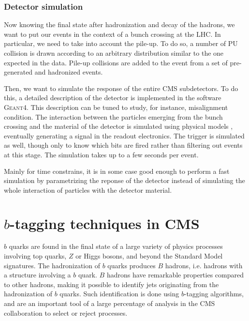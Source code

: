             \subsection{Detector simulation}

            Now knowing the final state after hadronization and decay of the hadrons, we
            want to put our events in the context of a bunch crossing at the LHC. In
            particular, we need to take into account the pile-up. To do so, a number of
            PU collision is drawn according to an arbitrary distribution similar to the
            one expected in the data. Pile-up collisions are added to the event from a
            set of pre-generated and hadronized events.

            Then, we want to simulate the response of the entire CMS subdetectors. To do
            this, a detailed description of the detector is implemented in the software
            \textsc{Geant4}. This description can be tuned to study, for instance,
            misalignment condition. The interaction between the particles emerging from
            the bunch crossing and the material of the detector is simulated using physical
            models , eventually generating a signal in
            the readout electronics. The trigger is simulated as well, though only to know
            which bits are fired rather than filtering out events at this stage. The
            simulation takes up to a few seconds per event.

            Mainly for time constrains, it is in some case good enough to perform a
            fast simulation by parametrizing the reponse of the detector instead of
            simulating the whole interaction of particles with the detector material.

\setcounter{mtc}{5}
\chapter{$b$-tagging techniques in CMS}
\minitoc
\newpage

    $b$ quarks are found in the final state of a large variety of physics processes
    involving top quarks, $Z$ or Higgs bosons, and beyond the Standard Model signatures.
    The hadronization of $b$ quarks produces $B$ hadrons, i.e. hadrons with a structure
    involving a $b$ quark. $B$ hadrons have remarkable properties compared to other hadrons,
    making it possible to identify jets originating from the hadronization of $b$ quarks.
    Such identification is done using $b$-tagging algorithms, and are an important tool of
    a large percentage of analysis in the CMS collaboration to select or reject processes.

